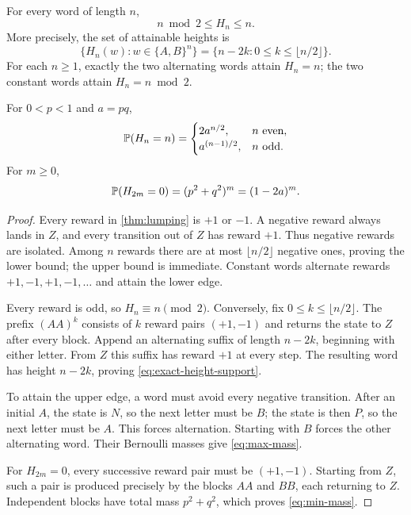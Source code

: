 \begin{proposition}
\label{prop:word-geometry}
For every word of length $n$,
\begin{equation}
 \label{eq:word-bounds}
 \boxed{\quad n\bmod2\leq H_n\leq n.\quad}
\end{equation}
More precisely, the set of attainable heights is
\begin{equation}
 \label{eq:exact-height-support}
 \boxed{\quad
 \{H_n(w):w\in\{A,B\}^n\}
 =\{n-2k:0\leq k\leq\lfloor n/2\rfloor\}.
 \quad}
\end{equation}
For each $n\geq1$, exactly the two alternating words attain $H_n=n$; the
two constant words attain $H_n=n\bmod2$.

For $0<p<1$ and $a=pq$,
\begin{equation}
 \label{eq:max-mass}
 \mathbb{P}(H_n=n)=
 \begin{cases}
 2a^{n/2},&n\text{ even},\\
 a^{(n-1)/2},&n\text{ odd}.
 \end{cases}
\end{equation}
For $m\geq0$,
\begin{equation}
 \label{eq:min-mass}
 \mathbb{P}(H_{2m}=0)=(p^2+q^2)^m=(1-2a)^m.
\end{equation}
\end{proposition}

\begin{proof}
Every reward in \cref{thm:lumping} is $+1$ or $-1$.  A negative reward
always lands in $Z$, and every transition out of $Z$ has reward $+1$.
Thus negative rewards are isolated.  Among $n$ rewards there are at most
$\lfloor n/2\rfloor$ negative ones, proving the lower bound; the upper bound
is immediate.  Constant words alternate rewards $+1,-1,+1,-1,\ldots$ and
attain the lower edge.

Every reward is odd, so $H_n\equiv n\pmod2$.  Conversely, fix
$0\leq k\leq\lfloor n/2\rfloor$.  The prefix $(AA)^k$ consists of $k$
reward pairs $(+1,-1)$ and returns the state to $Z$ after every block.
Append an alternating suffix of length $n-2k$, beginning with either letter.
From $Z$ this suffix has reward $+1$ at every step.  The resulting word has
height $n-2k$, proving \eqref{eq:exact-height-support}.

To attain the upper edge, a word must avoid every negative transition.
After an initial $A$, the state is $N$, so the next letter must be $B$; the
state is then $P$, so the next letter must be $A$.  This forces alternation.
Starting with $B$ forces the other alternating word.  Their Bernoulli masses
give \eqref{eq:max-mass}.

For $H_{2m}=0$, every successive reward pair must be $(+1,-1)$.  Starting
from $Z$, such a pair is produced precisely by the blocks $AA$ and $BB$,
each returning to $Z$.  Independent blocks have total mass $p^2+q^2$,
which proves \eqref{eq:min-mass}.
\end{proof}

